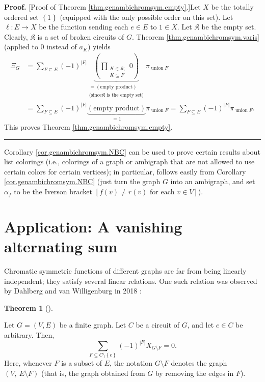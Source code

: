 \documentclass[numbers=enddot,12pt,final,onecolumn,notitlepage]{scrartcl}%
\theoremstyle{definition}
\newtheorem{theo}{Theorem}[section]
\newenvironment{theorem}[1][]
{\begin{theo}[#1]\begin{leftbar}}
{\end{leftbar}\end{theo}}
\newenvironment{proof}[1][Proof]{\noindent\textbf{#1.} }{\ \rule{0.5em}{0.5em}}
\newenvironment{verlong}{}{}
\let\sumnonlimits\sum
\let\prodnonlimits\prod
\renewcommand{\sum}{\sumnonlimits\limits}
\renewcommand{\prod}{\prodnonlimits\limits}
\begin{document}
\begin{verlong}
\begin{proof}
[Proof of Theorem \ref{thm.genambichromsym.empty}.]Let $X$ be the totally
ordered set $\left\{  1\right\}  $ (equipped with the only possible order on
this set). Let $\ell:E\rightarrow X$ be the function sending each $e\in E$ to
$1\in X$. Let $\mathfrak{K}$ be the empty set. Clearly, $\mathfrak{K}$ is a
set of broken circuits of $G$. Theorem \ref{thm.genambichromsym.varis}
(applied to $0$ instead of $a_{K}$) yields%
\begin{align*}
\Xi_{G}  &  =\sum_{F\subseteq E}\left(  -1\right)  ^{\left\vert F\right\vert
}\underbrace{\left(  \prod_{\substack{K\in\mathfrak{K};\\K\subseteq
F}}0\right)  }_{\substack{=\left(  \text{empty product}\right)  \\\text{(since
}\mathfrak{K}\text{ is the empty set)}}}\pi_{\operatorname*{union}F}\\
&  =\sum_{F\subseteq E}\left(  -1\right)  ^{\left\vert F\right\vert
}\underbrace{\left(  \text{empty product}\right)  }_{=1}\pi
_{\operatorname*{union}F}=\sum_{F\subseteq E}\left(  -1\right)  ^{\left\vert
F\right\vert }\pi_{\operatorname*{union}F}.
\end{align*}
This proves Theorem \ref{thm.genambichromsym.empty}.
\end{proof}
\end{verlong}

Corollary \ref{cor.genambichromsym.NBC} can be used to prove certain results
about list colorings (i.e., colorings of a graph or ambigraph that are not
allowed to use certain colors for certain vertices); in particular,
\cite[Lemma 3.2]{Erey19} follows easily from Corollary
\ref{cor.genambichromsym.NBC} (just turn the graph $G$ into an ambigraph, and
set $\alpha_{f}$ to be the Iverson bracket $\left[  f\left(  v\right)  \neq
r\left(  v\right)  \text{ for each }v\in V\right]  $).

\section{\label{sec.alt-sum}Application: A vanishing alternating sum}

Chromatic symmetric functions of different graphs are far from being linearly
independent; they satisfy several linear relations. One such relation was
observed by Dahlberg and van Willigenburg in 2018 \cite[Proposition
5]{DahWil18}:

\begin{theorem}
\label{thm.dahwil.graph}Let $G=\left(  V,E\right)  $ be a finite graph. Let
$C$ be a circuit of $G$, and let $e\in C$ be arbitrary. Then,%
\[
\sum_{F\subseteq C\setminus\left\{  e\right\}  }\left(  -1\right)
^{\left\vert F\right\vert }X_{G\setminus F}=0.
\]
Here, whenever $F$ is a subset of $E$, the notation $G\setminus F$ denotes the
graph $\left(  V,\ E\setminus F\right)  $ (that is, the graph obtained from
$G$ by removing the edges in $F$).
\end{theorem}
\end{document}
